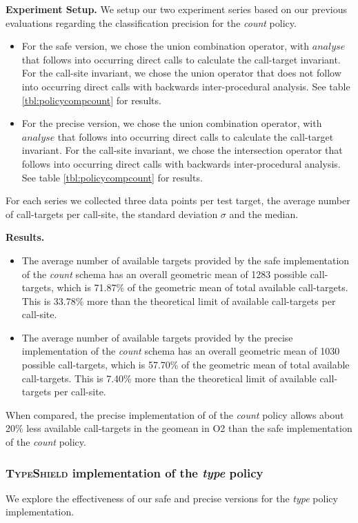 \textbf{Experiment Setup.} We setup our two experiment series based on our previous evaluations regarding the classification precision for the \textit{count} policy.
\begin{itemize}
\item For the safe version, we chose the union combination operator, with $analyse$ that follows into occurring direct calls to 
calculate the call-target invariant. For the call-site invariant, we chose the union operator that does not follow into occurring direct calls with backwards inter-procedural analysis.  See table \ref{tbl:policycompcount} for results. 
\item For the precise version, we chose the union combination operator, with $analyse$ that follows into occurring direct calls to calculate the call-target invariant. For the 
call-site invariant, we chose the intersection operator that follows into occurring direct calls with backwards inter-procedural analysis. See table \ref{tbl:policycompcount} 
for results. 
\end{itemize}
For each series we collected three data points per test target, the average number of call-targets per call-site, the standard deviation $\sigma$ and the median.

\textbf{Results.}
\begin{itemize}
\item The average number of available targets provided by the safe implementation of the \textit{count} schema has an overall geometric mean of  1283 possible call-targets, 
which is 71.87\% of the geometric mean of total available call-targets. This is 33.78\% more than the theoretical limit of available call-targets per call-site.
\item The average number of available targets provided by the precise implementation of the \textit{count} schema has an overall geometric mean of  1030 possible call-targets, 
which is 57.70\% of the geometric mean of total available call-targets. This is 7.40\% more than the theoretical limit of available call-targets per call-site.
\end{itemize}

When compared, the precise implementation of of the \textit{count} policy allows about 20\% less available call-targets in the geomean in O2 than the safe implementation of 
the \textit{count} policy.

\subsubsection{\textsc{TypeShield} implementation of the \textit{type} policy}
\label{subsection:typeshieldvslimitcount}
We explore the effectiveness of our safe and precise versions for the \textit{type} policy implementation.


